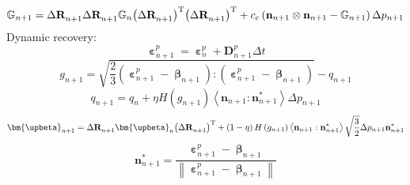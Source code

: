 \begin{equation}
{\mathbb{G}_{n + 1}} = \Delta {\mathbf{R}}_{n + 1}^{} \Delta {\mathbf{R}}_{n + 1}^{} {\mathbb{G}_{n}} {\left( {\Delta {\mathbf{R}}_{n + 1}^{}} \right)^{\rm{T}}} {\left( {\Delta {\mathbf{R}}_{n + 1}^{}} \right)^{\rm{T}}} + {c_c}\left( {{{\mathbf{n}}_{n + 1}} \otimes {{\mathbf{n}}_{n + 1}} - {\mathbb{G}_{n + 1}}} \right)\Delta {p_{n + 1}}
\end{equation}
Dynamic recovery:
\begin{equation}
{\bm{\upepsilon }}_{n + 1}^p = {\bm{\upepsilon }}_{n}^p + {\mathbf{D}}_{n + 1}^p\Delta t
\end{equation}
\begin{equation}
{g_{n + 1}} = \sqrt {\frac{2}{3}\left( { {\bm{\upepsilon }}_{n + 1}^p - {{\bm{\upbeta }}_{n + 1}}} \right):\left( { {\bm{\upepsilon }}_{n + 1}^p - {{\bm{\upbeta }}_{n + 1}}} \right)}  - {q_{n + 1}}
\end{equation}
\begin{equation}
{q_{n + 1}} = {q_{n}} + \eta H\left( {{g_{n + 1}}} \right)\left\langle {{{\mathbf{n}}_{n + 1}}:{\mathbf{n}}_{n + 1}^*} \right\rangle \Delta {p_{n + 1}}
\end{equation}
\begin{equation}
{{\bm{\upbeta }}_{n + 1}} = \Delta {\mathbf{R}}_{n + 1}^{}{{\bm{\upbeta }}_n}{\left( {\Delta {\mathbf{R}}_{n + 1}^{}} \right)^{\rm{T}}} +
\left( {1 - \eta } \right)H\left( {{g_{n + 1}}} \right)\left\langle {{{\mathbf{n}}_{n + 1}}:{\mathbf{n}}_{n + 1}^*} \right\rangle \sqrt {\frac{3}{2}} \Delta {p_{n + 1}}{\mathbf{n}}_{n + 1}^*
\end{equation}
\begin{equation}
{\mathbf{n}}_{n + 1}^* = \frac{{{\bm{\upepsilon }}_{n + 1}^p - {{\bm{\upbeta }}_{n + 1}}}}{{\left\| {{\bm{\upepsilon }}_{n + 1}^p - {{\bm{\upbeta }}_{n + 1}}} \right\|}}
\end{equation}


